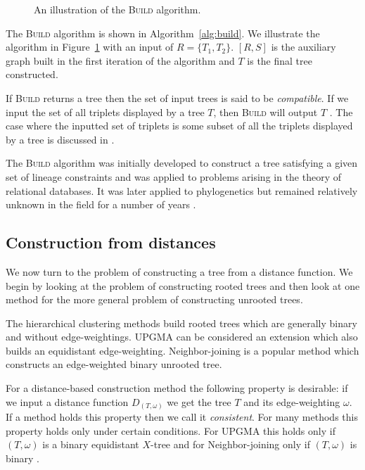 \begin{figure}
  \centering
  
  \caption{An illustration of the \textsc{Build} algorithm.}
  \label{fig:build-ex}
\end{figure}

The \textsc{Build} algorithm is shown in Algorithm~\ref{alg:build}.  We
illustrate the algorithm in Figure~\ref{fig:build-ex} with an input of $R =
\{T_1,T_2\}$.  $[R,S]$ is the auxiliary graph built in the first iteration of
the algorithm and $T$ is the final tree constructed.

If \textsc{Build} returns a tree then the set of input trees is said to be
\textit{compatible}.  If we input the set of all triplets displayed by a tree
$T$, then \textsc{Build} will output $T$ \cite{semple2003phylogenetics}.  The
case where the inputted set of triplets is some subset of all the triplets
displayed by a tree is discussed in \cite[Section
2.5.2]{bryant97buildingtrees}.

The \textsc{Build} algorithm was initially developed to construct a tree
satisfying a given set of lineage constraints and was applied to problems
arising in the theory of relational databases.  It was later applied to
phylogenetics but remained relatively unknown in the field for a number of
years \cite{steel1992complexity,bryant04supertree}.

\subsection{Construction from distances}
\label{sec:constr-from-dist}

We now turn to the problem of constructing a tree from a distance function.
We begin by looking at the problem of constructing rooted trees and then look
at one method for the more general problem of constructing unrooted trees.

The hierarchical clustering methods build rooted trees which are generally
binary and without edge-weightings.  UPGMA \cite{sokal1958statistical} can be
considered an extension which also builds an equidistant edge-weighting.
Neighbor-joining \cite{saitou1987nj} is a popular method which constructs an
edge-weighted binary unrooted tree.

For a distance-based construction method the following property is desirable:
if we input a distance function $D_{(T,\omega)}$ we get the tree $T$ and its
edge-weighting $\omega$.  If a method holds this property then we call it
\textit{consistent}.  For many methods this property holds only under certain
conditions.  For UPGMA this holds only if $(T,\omega)$ is a binary equidistant
$X$-tree and for Neighbor-joining only if $(T,\omega)$ is binary
\cite{semple2003phylogenetics}.

